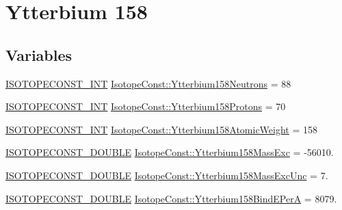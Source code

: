 \hypertarget{group___isotope_const-_ytterbium-_yb158}{}\section{Ytterbium 158}
\label{group___isotope_const-_ytterbium-_yb158}
\subsection*{Variables}
\begin{DoxyCompactItemize}
\item 
\mbox{\hyperlink{group___isotope_const-_macros_ga5f18360b3e99483a35c32d789e62621c}{I\+S\+O\+T\+O\+P\+E\+C\+O\+N\+S\+T\+\_\+\+I\+NT}} \mbox{\hyperlink{group___isotope_const-_ytterbium-_yb158_gaf6b37cd3381ef865f28e8bbeba2477e7}{Isotope\+Const\+::\+Ytterbium158\+Neutrons}} = 88
\item 
\mbox{\hyperlink{group___isotope_const-_macros_ga5f18360b3e99483a35c32d789e62621c}{I\+S\+O\+T\+O\+P\+E\+C\+O\+N\+S\+T\+\_\+\+I\+NT}} \mbox{\hyperlink{group___isotope_const-_ytterbium-_yb158_gab626319923edf85a7321aa6da5a78130}{Isotope\+Const\+::\+Ytterbium158\+Protons}} = 70
\item 
\mbox{\hyperlink{group___isotope_const-_macros_ga5f18360b3e99483a35c32d789e62621c}{I\+S\+O\+T\+O\+P\+E\+C\+O\+N\+S\+T\+\_\+\+I\+NT}} \mbox{\hyperlink{group___isotope_const-_ytterbium-_yb158_ga57181cdedfb3072c5338e4d2afb1d1c9}{Isotope\+Const\+::\+Ytterbium158\+Atomic\+Weight}} = 158
\item 
\mbox{\hyperlink{group___isotope_const-_macros_ga8f45a7272ce02c0b4c65c44636ed719a}{I\+S\+O\+T\+O\+P\+E\+C\+O\+N\+S\+T\+\_\+\+D\+O\+U\+B\+LE}} \mbox{\hyperlink{group___isotope_const-_ytterbium-_yb158_ga6e19af7461159734ebd3e99bc8aa16fe}{Isotope\+Const\+::\+Ytterbium158\+Mass\+Exc}} = -\/56010.
\item 
\mbox{\hyperlink{group___isotope_const-_macros_ga8f45a7272ce02c0b4c65c44636ed719a}{I\+S\+O\+T\+O\+P\+E\+C\+O\+N\+S\+T\+\_\+\+D\+O\+U\+B\+LE}} \mbox{\hyperlink{group___isotope_const-_ytterbium-_yb158_ga099f8b9fee0ea939080a3ffe2221b31b}{Isotope\+Const\+::\+Ytterbium158\+Mass\+Exc\+Unc}} = 7.
\item 
\mbox{\hyperlink{group___isotope_const-_macros_ga8f45a7272ce02c0b4c65c44636ed719a}{I\+S\+O\+T\+O\+P\+E\+C\+O\+N\+S\+T\+\_\+\+D\+O\+U\+B\+LE}} \mbox{\hyperlink{group___isotope_const-_ytterbium-_yb158_gaa715b64ca46a6821844425c49da5cff9}{Isotope\+Const\+::\+Ytterbium158\+Bind\+E\+PerA}} = 8079.
\item 

\end{DoxyCompactItemize}
